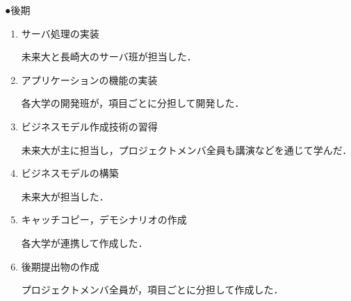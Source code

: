 ●後期
\begin{enumerate}
\item サーバ処理の実装
\par 未来大と長崎大のサーバ班が担当した．
\item アプリケーションの機能の実装
\par 各大学の開発班が，項目ごとに分担して開発した．
\item ビジネスモデル作成技術の習得
\par 未来大が主に担当し，プロジェクトメンバ全員も講演などを通じて学んだ．
\item ビジネスモデルの構築
\par 未来大が担当した．
\item キャッチコピー，デモシナリオの作成
\par 各大学が連携して作成した．
\item 後期提出物の作成
\par プロジェクトメンバ全員が，項目ごとに分担して作成した．
\end{enumerate}
